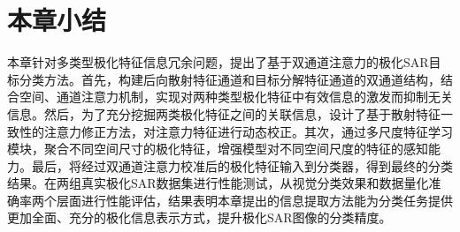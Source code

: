 \section{本章小结}
本章针对多类型极化特征信息冗余问题，提出了基于双通道注意力的极化SAR目标分类方法。首先，构建后向散射特征通道和目标分解特征通道的双通道结构，结合空间、通道注意力机制，实现对两种类型极化特征中有效信息的激发而抑制无关信息。然后，为了充分挖掘两类极化特征之间的关联信息，设计了基于散射特征一致性的注意力修正方法，对注意力特征进行动态校正。其次，通过多尺度特征学习模块，聚合不同空间尺寸的极化特征，增强模型对不同空间尺度的特征的感知能力。最后，将经过双通道注意力校准后的极化特征输入到分类器，得到最终的分类结果。在两组真实极化SAR数据集进行性能测试，从视觉分类效果和数据量化准确率两个层面进行性能评估，结果表明本章提出的信息提取方法能为分类任务提供更加全面、充分的极化信息表示方式，提升极化SAR图像的分类精度。